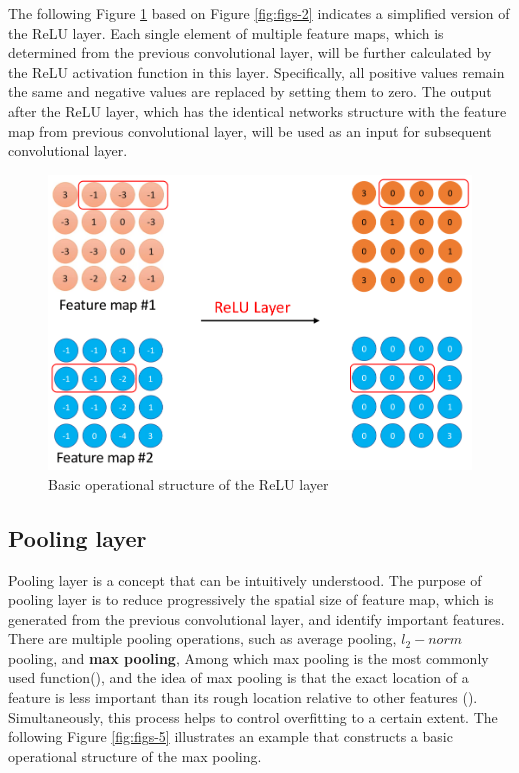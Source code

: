 \documentclass[]{krantz}
\begin{document}
The following Figure \ref{fig:figs-4} based on Figure \ref{fig:figs-2} indicates a simplified version of the ReLU layer. Each single element of multiple feature maps, which is determined from the previous convolutional layer, will be further calculated by the ReLU activation function in this layer. Specifically, all positive values remain the same and negative values are replaced by setting them to zero. The output after the ReLU layer, which has the identical networks structure with the feature map from previous convolutional layer, will be used as an input for subsequent convolutional layer.

\begin{figure}[ht]

{\centering \includegraphics[width=0.5\linewidth]{figures/01-03-cnns-and-their-applications-in-nlp/ReLU} 

}

\caption{Basic operational structure of the ReLU layer }\label{fig:figs-4}
\end{figure}

\hypertarget{pooling-layer}{%
\subsection{Pooling layer}\label{pooling-layer}}

Pooling layer is a concept that can be intuitively understood. The purpose of pooling layer is to reduce progressively the spatial size of feature map, which is generated from the previous convolutional layer, and identify important features.
There are multiple pooling operations, such as average pooling, \(l_{2}-norm\) pooling, and \textbf{max pooling}, Among which max pooling is the most commonly used function(\citet{Scherer2010EvaluationOP}), and the idea of max pooling is that the exact location of a feature is less important than its rough location relative to other features (\citet{Yamaguchi1990ANN}). Simultaneously, this process helps to control overfitting to a certain extent. The following Figure \ref{fig:figs-5} illustrates an example that constructs a basic operational structure of the max pooling.
\end{document}
